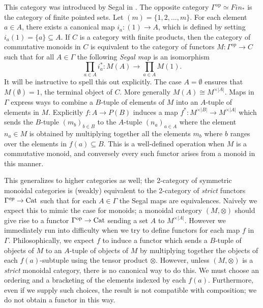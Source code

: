 \documentclass{amsart}
\begin{document}
This category was introduced by Segal in \cite{Segal-Categories and Cohomology Theories}.  The opposite category $\Gamma^\textrm{op} \simeq Fin_*$ is the category of finite pointed sets. Let $(m) = \{ 1, 2, \dots, m\}$. For each element $a \in A$, there exists a canonical map $i_a: (1) \to A$, which is defined by setting $i_a(1) = \{a\} \subseteq A$. If $C$ is a category with finite products, then the category of commutative monoids in $C$ is equivalent to the category of functors $M:\Gamma^{op} \to C$ such that for all $A\in \Gamma$ the following {\em Segal map} is an isomorphism
\begin{equation*}
	\prod_{a \in A} i_a^*: M(A) \to \prod_{a \in A} M(1).
\end{equation*}
It will be instructive to spell this out explicitly. The case $A=\emptyset$ ensures that $M(\emptyset) = 1$, the terminal object of $C$. More generally $M(A) \cong M^{\times |A|}$. Maps in $\Gamma$ express ways to combine a $B$-tuple of elements of $M$ into an $A$-tuple of elements in $M$. Explicitly $f: A \to P(B)$
induces a map $f^*: M^{\times |B|} \to M^{\times |A|}$ which sends the $B$-tuple $(m_b)_{b \in B}$ to the $A$-tuple $(n_a)_{a \in A}$ where the element $n_a \in M$ is obtained by multiplying together all the elements $m_b$ where $b$ ranges over the elements in $f(a) \subseteq B$. This is a well-defined operation when $M$ is a commutative monoid, and conversely every such functor arises from a monoid in this manner. 

This generalizes to higher categories as well; the 2-category of symmetric monoidal categories is (weakly) equivalent to the 2-category of {\em strict} functors $\Gamma^{op} \to \mathrm{Cat}$ such that for each $A \in \Gamma$ the Segal maps are equivalences. Naively we expect this to mimic the case for monoids; a monoidal category $(M, \otimes)$ should give rise to a functor $\Gamma^\text{op} \to \mathrm{Cat}$ sending a set $A$ to $M^{\times |A|}$. However we immediately run into difficulty when we try to define functors for each map $f$ in $\Gamma$. Philosophically, we expect $f$ to induce a functor which sends a $B$-tuple of objects of $M$ to an $A$-tuple of objects of $M$ by multiplying together the objects of each $f(a)$-subtuple using the tensor product $\otimes$. However, unless $(M, \otimes)$ is a {\em strict} monoidal category, there is no canonical way to do this. We must choose an ordering and a bracketing of the elements indexed by each $f(a)$. Furthermore, even if we supply such choices, the result is not compatible with composition; we do not obtain a functor in this way. 
\end{document}
